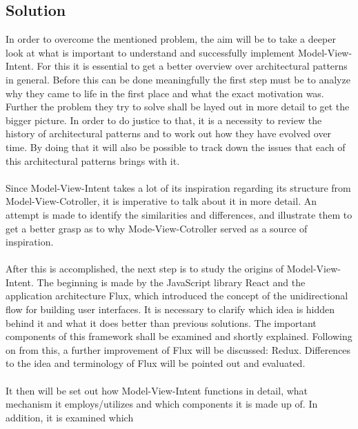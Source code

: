 \subsection{Solution}
\label{subsec:solution}


In order to overcome the mentioned problem, the aim will be to take a deeper look at what is important to understand and successfully implement Model-View-Intent.
For this it is essential to get a better overview over architectural patterns in general. Before this can be done meaningfully the first step must be 
to analyze why they came to life in the first place and what the exact motivation was. Further the problem they try to solve shall be layed out in more detail to 
get the bigger picture. In order to do justice to that, it is a necessity to review the history of architectural patterns and to work out how they have evolved over time.
By doing that it will also be possible to track down the issues that each of this architectural patterns brings with it.
\\
\\
Since Model-View-Intent takes a lot of its inspiration regarding its structure from Model-View-Cotroller, it is imperative to talk about it in more detail.
An attempt is made to identify the similarities and differences, and illustrate them to get a better grasp as to why Mode-View-Cotroller served as a source of inspiration.
\\
\\
After this is accomplished, the next step is to study the origins of Model-View-Intent. The beginning is made by the JavaScript library React and the application architecture
Flux, which introduced the concept of the unidirectional flow for building user interfaces. It is necessary to clarify which idea is hidden behind it and what it does
better than previous solutions. The important components of this framework shall be examined and shortly explained. Following on from this, a further improvement of Flux will 
be discussed: Redux. Differences to the idea and terminology of Flux will be pointed out and evaluated.
\\
\\
It then will be set out how Model-View-Intent functions in detail, what mechanism it employs/utilizes and which components it is made up of. In addition, it is examined which 
